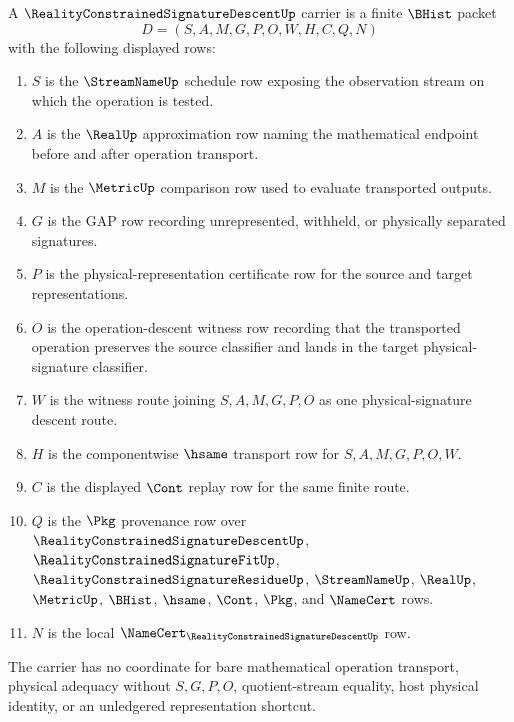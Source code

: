 \begin{definition}
\label{def:reality-constrained-signature-descent-carrier}
A $\RealityConstrainedSignatureDescentUp$ carrier is a finite $\BHist$ packet
$$
D=(S,A,M,G,P,O,W,H,C,Q,N)
$$
with the following displayed rows:
\begin{enumerate}
\item $S$ is the $\StreamNameUp$ schedule row exposing the observation stream on which the operation is tested.
\item $A$ is the $\RealUp$ approximation row naming the mathematical endpoint before and after operation transport.
\item $M$ is the $\MetricUp$ comparison row used to evaluate transported outputs.
\item $G$ is the GAP row recording unrepresented, withheld, or physically separated signatures.
\item $P$ is the physical-representation certificate row for the source and target representations.
\item $O$ is the operation-descent witness row recording that the transported operation preserves the source classifier and lands in the target physical-signature classifier.
\item $W$ is the witness route joining $S,A,M,G,P,O$ as one physical-signature descent route.
\item $H$ is the componentwise $\hsame$ transport row for $S,A,M,G,P,O,W$.
\item $C$ is the displayed $\Cont$ replay row for the same finite route.
\item $Q$ is the $\Pkg$ provenance row over $\RealityConstrainedSignatureDescentUp$, $\RealityConstrainedSignatureFitUp$, $\RealityConstrainedSignatureResidueUp$, $\StreamNameUp$, $\RealUp$, $\MetricUp$, $\BHist$, $\hsame$, $\Cont$, $\Pkg$, and $\NameCert$ rows.
\item $N$ is the local $\NameCert_{\RealityConstrainedSignatureDescentUp}$ row.
\end{enumerate}
The carrier has no coordinate for bare mathematical operation transport, physical adequacy without $S,G,P,O$, quotient-stream equality, host physical identity, or an unledgered representation shortcut.
\end{definition}

